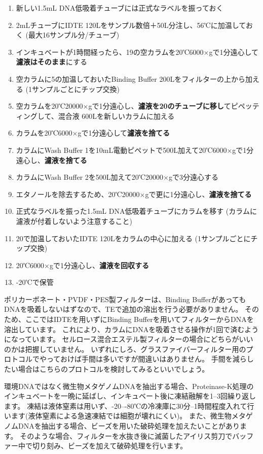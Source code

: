 \documentclass[titlepage,10pt,a4paper]{jsbook}
\begin{document}
\begin{enumerate}
\item 新しい1.5mL DNA低吸着チューブには正式なラベルを振っておく
\item 2mLチューブにIDTE 120{\textmu}Lをサンプル数倍＋50{\textmu}L分注し、56℃に加温しておく (最大16サンプル分/チューブ)
\item インキュベートが1時間経ったら、19の空カラムを20℃6000×gで1分遠心して\textbf{濾液はそのまま}にする
\item 空カラムに5の加温しておいたBinding Buffer 200{\textmu}Lをフィルターの上から加える (1サンプルごとにチップ交換)
\item 空カラムを20℃20000×gで1分遠心し、\textbf{濾液を20のチューブに移し}てピペッティングして、混合液 600{\textmu}Lを新しいカラムに加える
\item カラムを20℃6000×gで1分遠心して\textbf{濾液を捨てる}
\item カラムにWash Buffer 1を10mL電動ピペットで500{\textmu}L加えて20℃6000×gで1分遠心し、\textbf{濾液を捨てる}
\item カラムにWash Buffer 2を500{\textmu}L加えて20℃20000×gで3分遠心する
\item エタノールを除去するため、20℃20000×gで更に1分遠心し、\textbf{濾液を捨てる}
\item 正式なラベルを振った1.5mL DNA低吸着チューブにカラムを移す (カラムに濾液が付着しないよう注意すること)
\item 20で加温しておいたIDTE 120{\textmu}Lをカラムの中心に加える (1サンプルごとにチップ交換)
\item 20℃6000×gで1分遠心し、\textbf{濾液を回収する}
\item -20℃で保管
\end{enumerate}

ポリカーボネート・PVDF・PES製フィルターは、Binding BufferがあってもDNAを吸着しないはずなので、TEで追加の溶出を行う必要がありません。
そのため、ここではIDTEを用いずにBinding Bufferを用いてフィルターからDNAを溶出しています。
これにより、カラムにDNAを吸着させる操作が1回で済むようになっています。
セルロース混合エステル製フィルターの場合にどちらがいいのかは把握していません。
いずれにしろ、グラスファイバーフィルター用のプロトコルでやっておけば手間は多いですが間違いはありません。
手間を減らしたい場合はこちらのプロトコルを検討してみるといいでしょう。

環境DNAではなく微生物メタゲノムDNAを抽出する場合、Proteinase-K処理のインキュベートを一晩に延ばし、インキュベート後に凍結融解を1--3回繰り返します。
凍結は液体窒素は用いず、{-20}--{-80}℃の冷凍庫に30分--1時間程度入れて行います(液体窒素による急速凍結では細胞が壊れにくい)。
また、微生物メタゲノムDNAを抽出する場合、ビーズを用いた破砕処理を加えたいことがあります。
そのような場合、フィルターを水抜き後に滅菌したアイリス剪刀でバッファー中で切り刻み、ビーズを加えて破砕処理を行います。
\end{document}
